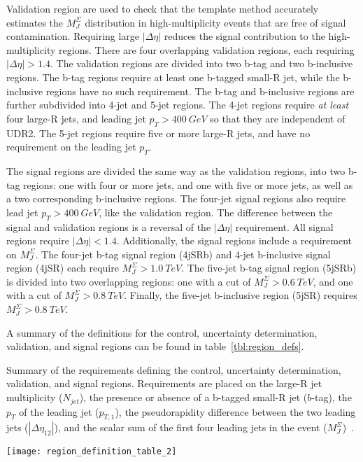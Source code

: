 Validation region are used to check that the template method accurately estimates the $M_J^{\Sigma}$ distribution in
high-multiplicity events that are free of signal contamination.
Requiring large $|\Delta\eta|$ reduces the signal contribution to the high-multiplicity regions.
There are four overlapping validation regions, each requiring $|\Delta\eta| > 1.4$.
The validation regions are divided into two b-tag and two b-inclusive regions.
The b-tag regions require at least one b-tagged small-R jet, while the b-inclusive regions have no such requirement.
The b-tag and b-inclusive regions are further subdivided into 4-jet and 5-jet regions.
The 4-jet regions require \textit{at least} four large-R jets, and leading jet $p_T>400~GeV$ so that they are independent of UDR2.
The 5-jet regions require five or more large-R jets, and have no requirement on the leading jet $p_T$.

The signal regions are divided the same way as the validation regions, into two b-tag regions: one with four or more jets,
and one with five or more jets, as well as a two corresponding b-inclusive regions.
The four-jet signal regions also require lead jet $p_T>400~GeV$, like the validation region.
The difference between the signal and validation regions is a reversal of the $|\Delta\eta|$ requirement.
All signal regions require $|\Delta\eta|<1.4$.
Additionally, the signal regions include a requirement on $M_J^{\Sigma}$.
The four-jet b-tag signal region (4jSRb) and 4-jet b-inclusive signal region (4jSR) each require $M_J^{\Sigma} > 1.0~TeV$.
The five-jet b-tag signal region (5jSRb) is divided into two overlapping regions: one with a cut of $M_J^{\Sigma}>0.6~TeV$,
and one with a cut of $M_J^{\Sigma}>0.8~TeV$.
Finally, the five-jet b-inclusive region (5jSR) requires $M_J^{\Sigma}>0.8~TeV$.

A summary of the definitions for the control, uncertainty determination, validation, and signal regions can be found in table~\ref{tbl:region_defs}.

\begin{table}
    \caption{Summary of the requirements defining the control, uncertainty determination, validation, and signal regions.
    Requirements are placed on the large-R jet multiplicity ($N_{jet}$), the presence or absence of a b-tagged small-R jet ($b$-tag),
    the $p_T$ of the leading jet ($p_{T,1}$), the pseudorapidity difference between the two leading jets ($|\Delta\eta_{12}|$),
    and the scalar sum of the first four leading jets in the event ($M_J^{\Sigma}$)~\cite{paper-plb}.}
    \label{tbl:region_defs}
    \texttt{[image: region\_definition\_table\_2]}
\end{table}

